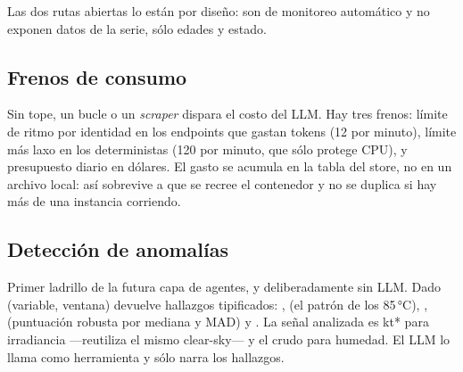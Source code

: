 Las dos rutas abiertas lo están por diseño: son de monitoreo automático y no exponen
datos de la serie, sólo edades y estado.

\subsection{Frenos de consumo}

Sin tope, un bucle o un \emph{scraper} dispara el costo del LLM. Hay tres frenos:
límite de ritmo por identidad en los endpoints que gastan tokens (12 por minuto),
límite más laxo en los deterministas (120 por minuto, que sólo protege CPU), y
presupuesto diario en dólares. El gasto se acumula en la tabla  del
store, no en un archivo local: así sobrevive a que se recree el contenedor y no se
duplica si hay más de una instancia corriendo.

\subsection{Detección de anomalías}

Primer ladrillo de la futura capa de agentes, y deliberadamente sin LLM. Dado
(variable, ventana) devuelve hallazgos tipificados: ,
 (el patrón de los 85\,°C), , 
(puntuación robusta por mediana y MAD) y . La señal analizada es kt* para
irradiancia ---reutiliza el mismo clear-sky--- y el crudo para humedad. El LLM lo llama
como herramienta y sólo narra los hallazgos.
